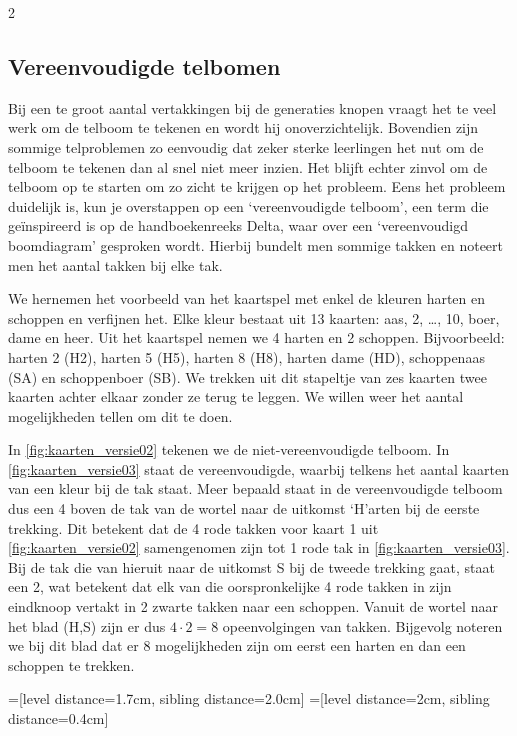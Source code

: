 \begin{multicols}{2}
\subsection{Vereenvoudigde telbomen}
Bij een te groot aantal vertakkingen bij de generaties knopen vraagt het te veel werk om de telboom te tekenen en wordt hij onoverzichtelijk. Bovendien zijn sommige telproblemen zo eenvoudig dat zeker sterke leerlingen het nut om de telboom te tekenen dan al snel niet meer inzien. Het blijft echter zinvol om de telboom op te starten om zo zicht te krijgen op het probleem. Eens het probleem duidelijk is, kun je overstappen op een ‘vereenvoudigde telboom’, een term die geïnspireerd is op de handboekenreeks Delta, waar over een ‘vereenvoudigd boomdiagram’ gesproken wordt. Hierbij bundelt men sommige takken en noteert men het aantal takken bij elke tak.

We hernemen het voorbeeld van het kaartspel met enkel de kleuren harten en schoppen en verfijnen het. Elke kleur bestaat uit 13 kaarten: aas, 2, …, 10, boer, dame en heer. Uit het kaartspel nemen we 4 harten en 2 schoppen. Bijvoorbeeld: harten 2 (H2), harten 5 (H5), harten 8 (H8), harten dame (HD), schoppenaas (SA) en schoppenboer (SB). We trekken uit dit stapeltje van zes kaarten twee kaarten achter elkaar zonder ze terug te leggen. We willen weer het aantal mogelijkheden tellen om dit te doen. 

In \autoref{fig:kaarten_versie02} tekenen we de niet-vereenvoudigde telboom. In \autoref{fig:kaarten_versie03} staat de vereenvoudigde, waarbij telkens het aantal kaarten van een kleur bij de tak staat. Meer bepaald staat in de vereenvoudigde telboom dus een 4 boven de tak van de wortel naar de uitkomst ‘H’arten bij de eerste trekking. Dit betekent dat de 4 rode takken voor kaart 1 uit \autoref{fig:kaarten_versie02} samengenomen zijn tot 1 rode tak in \autoref{fig:kaarten_versie03}. Bij de tak die van hieruit naar de uitkomst S bij de tweede trekking gaat, staat een 2, wat betekent dat elk van die oorspronkelijke 4 rode takken in zijn eindknoop vertakt in 2 zwarte takken naar een schoppen. Vanuit de wortel naar het blad (H,S) zijn er dus $4\cdot2=8$ opeenvolgingen van takken. Bijgevolg noteren we bij dit blad dat er 8 mogelijkheden zijn om eerst een harten en dan een schoppen te trekken.



\begin{afbeeldingenv}
=[level distance=1.7cm, sibling distance=2.0cm]
=[level distance=2cm, sibling distance=0.4cm]


\end{afbeeldingenv}
\end{multicols}
